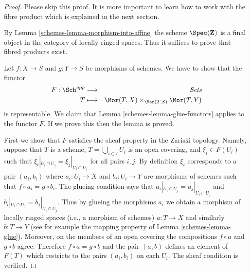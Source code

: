 \begin{proof}

Please skip this proof. It is more important to learn
how to work with the fibre product which is explained in
the next section.

\medskip\noindent
By Lemma \ref{schemes-lemma-morphism-into-affine}
the scheme $\Spec(\mathbf{Z})$ is a final
object in the category of locally ringed spaces. Thus it
suffices to prove that fibred products exist.

\medskip\noindent
Let $f : X \to S$ and $g : Y \to S$ be morphisms of schemes. We have to show
that the functor
\begin{eqnarray*}
F : \Sch^{opp} & \longrightarrow & \textit{Sets} \\
T & \longmapsto &
\Mor(T, X) \times_{\Mor(T, S)} \Mor(T, Y)
\end{eqnarray*}
is representable. We claim that Lemma \ref{schemes-lemma-glue-functors}
applies to the functor $F$. If we prove this then the lemma is proved.

\medskip\noindent
First we show that $F$ satisfies the sheaf property in the
Zariski topology. Namely, suppose that $T$ is a scheme,
$T = \bigcup_{i \in I} U_i$ is an open covering, and
$\xi_i \in F(U_i)$ such that
$\xi_i|_{U_i \cap U_j} =  \xi_j|_{U_i \cap U_j}$ for
all pairs $i, j$. By definition $\xi_i$ corresponds to
a pair $(a_i, b_i)$ where $a_i : U_i \to X$ and $b_i : U_i \to Y$
are morphisms of schemes such that $f \circ a_i = g \circ b_i$.
The glueing condition says that
$a_i|_{U_i \cap U_j} =  a_j|_{U_i \cap U_j}$
and
$b_i|_{U_i \cap U_j} =  b_j|_{U_i \cap U_j}$.
Thus by glueing the morphisms $a_i$ we obtain a morphism
of locally ringed spaces (i.e., a morphism of schemes)
$a : T \to X$ and similarly $b : T \to Y$ (see for example
the mapping property of Lemma \ref{schemes-lemma-glue}). Moreover,
on the members of an open covering the compositions
$f \circ a$ and $g \circ b$ agree. Therefore
$f \circ a = g \circ b$ and the pair $(a, b)$ defines
an element of $F(T)$ which restricts to the pairs
$(a_i, b_i)$ on each $U_i$. The sheaf condition is verified.


\end{proof}
